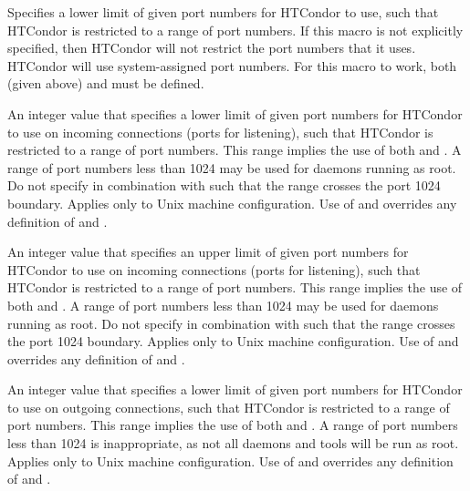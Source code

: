 \begin{description}
\label{param:LowPort}
\item[\Macro{LOWPORT}]
  Specifies a lower limit of given port numbers for HTCondor to use,
  such that HTCondor is restricted to a range of port numbers.
  If this macro is not explicitly specified, then HTCondor will
  not restrict the port numbers that it uses. HTCondor will use
  system-assigned port numbers.
  For this macro to work, both  (given above) and
   must be defined.

\label{param:InLowPort}
\item[\Macro{IN\_LOWPORT}]
  An integer value that specifies a lower limit of given port numbers
  for HTCondor to use on incoming connections (ports for listening),
  such that HTCondor is restricted to a range of port numbers.
  This range implies the use of both  and
  .
  A range of port numbers less than 1024 may be used for daemons 
  running as root.
  Do not specify  in combination with 
   such that the range crosses the port 1024
  boundary.
  Applies only to Unix machine configuration.
  Use of  and  overrides
  any definition of  and .

\label{param:InHighPort}
\item[\Macro{IN\_HIGHPORT}]
  An integer value that specifies an upper limit of given port numbers
  for HTCondor to use on incoming connections (ports for listening),
  such that HTCondor is restricted to a range of port numbers.
  This range implies the use of both  and
  .
  A range of port numbers less than 1024 may be used for daemons 
  running as root.
  Do not specify  in combination with 
   such that the range crosses the port 1024
  boundary.
  Applies only to Unix machine configuration.
  Use of  and  overrides
  any definition of  and .

\label{param:OutLowPort}
\item[\Macro{OUT\_LOWPORT}]
  An integer value that specifies a lower limit of given port numbers
  for HTCondor to use on outgoing connections,
  such that HTCondor is restricted to a range of port numbers.
  This range implies the use of both  and
  .
  A range of port numbers less than 1024 is inappropriate, as
  not all daemons and tools will be run as root.
  Applies only to Unix machine configuration.
  Use of  and  overrides
  any definition of  and .


\end{description}

